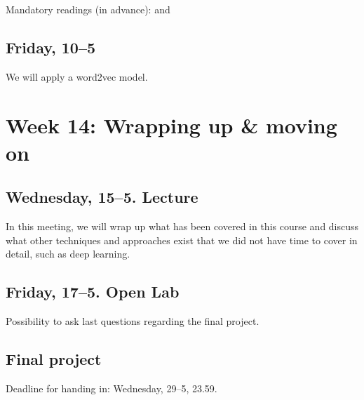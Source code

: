 \documentclass[a4paper,10pt]{report}
\begin{document}
Mandatory readings (in advance): \cite{Kusner2015} and \cite{Garg2017}



\subsection*{Friday, 10--5}
We will apply a word2vec model.



\section*{Week 14: Wrapping up \& moving on}

\subsection*{Wednesday, 15--5. Lecture}
In this meeting, we will wrap up what has been covered in this course and discuss what other techniques and approaches exist that we did not have time to cover in detail, such as deep learning. 

\subsection*{Friday, 17--5. Open Lab}
Possibility to ask last questions regarding the final project.

\subsection*{Final project}
Deadline for handing in: Wednesday, 29--5, 23.59.




 
 
 
\end{document}
